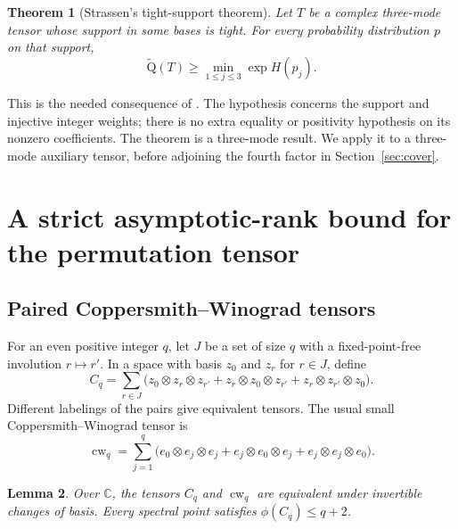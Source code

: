 \documentclass[10pt,a4paper]{article}
\newtheorem{theorem}{Theorem}[section]
\newtheorem{lemma}[theorem]{Lemma}
\theoremstyle{definition}
\theoremstyle{remark}
\numberwithin{equation}{section}
\newcommand{\C}{\mathbb C}
\newcommand{\AQ}{\widetilde{\mathrm Q}}
\begin{document}
\begin{theorem}[Strassen's tight-support theorem]\label{thm:tight}
Let $T$ be a complex three-mode tensor whose support in some bases is
tight. For every probability distribution $p$ on that support,
\begin{equation}\label{eq:tight-bound}
 \AQ(T)\geq \min_{1\leq j\leq3}\exp H(p_j).
\end{equation}
\end{theorem}

This is the needed consequence of
\cite[Definition~4.1, Theorem~4.4 and Corollary~4.5]{CVZ2018}.
The hypothesis concerns the support and injective integer weights;
there is no extra equality or positivity hypothesis on its nonzero
coefficients. The theorem is a three-mode result. We apply it to a
three-mode auxiliary tensor, before adjoining the fourth factor in
Section~\ref{sec:cover}.

\section{A strict asymptotic-rank bound for the permutation tensor}
\label{sec:exchange}

\subsection{Paired Coppersmith--Winograd tensors}\label{sec:cw}

For an even positive integer $q$, let $J$ be a set of size $q$
with a fixed-point-free involution $r\mapsto r'$. In a space with
basis $z_0$ and $z_r$ for $r\in J$, define
\begin{equation}\label{eq:paired-cw}
 C_q=\sum_{r\in J}
 \bigl(z_0\otimes z_r\otimes z_{r'}
       +z_r\otimes z_0\otimes z_{r'}
       +z_r\otimes z_{r'}\otimes z_0\bigr).
\end{equation}
Different labelings of the pairs give equivalent tensors.
The usual small Coppersmith--Winograd tensor is
\begin{equation}\label{eq:small-cw}
 \operatorname{cw}_q=\sum_{j=1}^q
 \bigl(e_0\otimes e_j\otimes e_j
       +e_j\otimes e_0\otimes e_j
       +e_j\otimes e_j\otimes e_0\bigr).
\end{equation}

\begin{lemma}\label{lem:cw-basis}
Over $\C$, the tensors $C_q$ and $\operatorname{cw}_q$ are
equivalent under invertible changes of basis. Every spectral point
satisfies $\phi(C_q)\leq q+2$.
\end{lemma}
\end{document}
